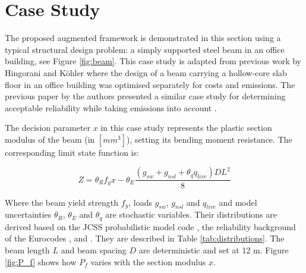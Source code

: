 \section{Case Study}








The proposed augmented framework is demonstrated in this section using a typical structural design problem: a simply supported steel beam in an office building, see Figure \ref{fig:beam}.
This case study is adapted from previous work by Hingorani and Köhler \citep{Hingorani2023SustainabilityDesign, Hingorani2023TowardsDesign} where the design of a beam carrying a hollow-core slab floor in an office building was optimised separately for costs and emissions.
The previous paper by the authors presented a similar case study for determining acceptable reliability while taking emissions into account \citep{Knibbe2026PlaceHolder}.

The decision parameter $x$ in this case study represents the plastic section modulus of the beam (in $[mm^3]$), setting its bending moment resistance.
The corresponding limit state function is:

\begin{equation}
    \label{eqn:LSF}
    Z = \theta_R f_y x - \theta_E \frac{(g_{sw} + g_{nsl} + \theta_q q_{live})DL^2}{8}
\end{equation}

Where the beam yield strength $f_y$, loads $g_{sw}$, $g_{nsl}$ and $q_{live}$ and model uncertainties $\theta_R$, $\theta_E$ and $\theta_q$ are stochastic variables.
Their distributions are derived based on the JCSS probabilistic model code \citep{JCSS2000ProbabilisticDesign}, the reliability background of the Eurocodes \citep{Vrouwenvelder2024ReliabilityEurocodes}, and \citep{Hingorani2023TowardsDesign}.
They are described in Table \ref{tab:distributions}.
The beam length $L$ and beam spacing $D$ are deterministic and set at 12 m.
Figure \ref{fig:P_f} shows how $P_f$ varies with the section modulus $x$.

